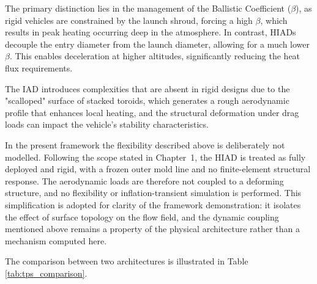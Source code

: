 The primary distinction lies in the management of the Ballistic Coefficient ($\beta$), as rigid vehicles are constrained by the launch shroud, forcing a high $\beta$, which results in peak heating occurring deep in the atmosphere. In contrast, HIADs decouple the entry diameter from the launch diameter, allowing for a much lower $\beta$. This enables deceleration at higher altitudes, significantly reducing the heat flux requirements.

The IAD introduces complexities that are absent in rigid designs due to the "scalloped" surface of stacked toroids, which generates a rough aerodynamic profile that enhances local heating, and the structural deformation under drag loads can impact the vehicle's stability characteristics.

\noindent In the present framework the flexibility described above is deliberately not modelled. Following the scope stated in Chapter~1, the HIAD is treated as fully deployed and rigid, with a frozen outer mold line and no finite-element structural response. The aerodynamic loads are therefore not coupled to a deforming structure, and no flexibility or inflation-transient simulation is performed. This simplification is adopted for clarity of the framework demonstration: it isolates the effect of surface topology on the flow field, and the dynamic coupling mentioned above remains a property of the physical architecture rather than a mechanism computed here.

The comparison between two architectures is illustrated in Table \ref{tab:tps_comparison}.

